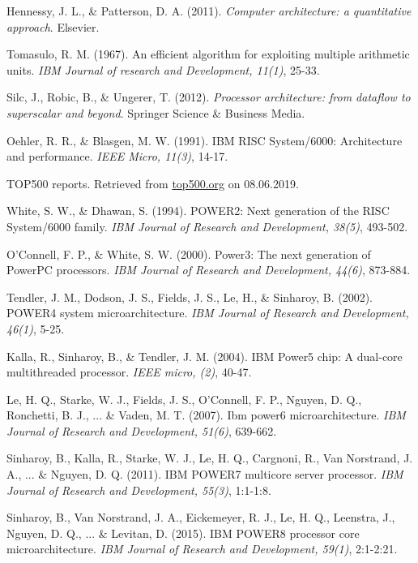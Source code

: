 \documentclass[12pt,a4paper]{article} %
\begin{document}
{\begin{thebibliography}{56}
    Hennessy, J. L., \& Patterson, D. A. (2011). \textit{Computer architecture: a quantitative approach}. Elsevier.
        
    Tomasulo, R. M. (1967). An efficient algorithm for exploiting multiple arithmetic units. \textit{IBM Journal of research and Development, 11(1)}, 25-33.
    
    Silc, J., Robic, B., \& Ungerer, T. (2012). \textit{Processor architecture: from dataflow to superscalar and beyond}. Springer Science \& Business Media.
    
    Oehler, R. R., \& Blasgen, M. W. (1991). IBM RISC System/6000: Architecture and performance. \textit{IEEE Micro, 11(3)}, 14-17.
    
    TOP500 reports. Retrieved from \url{top500.org} on 08.06.2019.
    
    White, S. W., \& Dhawan, S. (1994). POWER2: Next generation of the RISC System/6000 family. \textit{IBM Journal of Research and Development, 38(5)}, 493-502.
    
    O'Connell, F. P., \& White, S. W. (2000). Power3: The next generation of PowerPC processors. \textit{IBM Journal of Research and Development, 44(6)}, 873-884.
    
    Tendler, J. M., Dodson, J. S., Fields, J. S., Le, H., \& Sinharoy, B. (2002). POWER4 system microarchitecture. \textit{IBM Journal of Research and Development, 46(1)}, 5-25.
    
    Kalla, R., Sinharoy, B., \& Tendler, J. M. (2004). IBM Power5 chip: A dual-core multithreaded processor. \textit{IEEE micro, (2)}, 40-47.
    
    Le, H. Q., Starke, W. J., Fields, J. S., O'Connell, F. P., Nguyen, D. Q., Ronchetti, B. J., ... \& Vaden, M. T. (2007). Ibm power6 microarchitecture. \textit{IBM Journal of Research and Development, 51(6)}, 639-662.
    
    Sinharoy, B., Kalla, R., Starke, W. J., Le, H. Q., Cargnoni, R., Van Norstrand, J. A., ... \& Nguyen, D. Q. (2011). IBM POWER7 multicore server processor. \textit{IBM Journal of Research and Development, 55(3)}, 1:1-1:8.
    
    Sinharoy, B., Van Norstrand, J. A., Eickemeyer, R. J., Le, H. Q., Leenstra, J., Nguyen, D. Q., ... \& Levitan, D. (2015). IBM POWER8 processor core microarchitecture. \textit{IBM Journal of Research and Development, 59(1)}, 2:1-2:21.
    

\end{thebibliography}}
\end{document}
